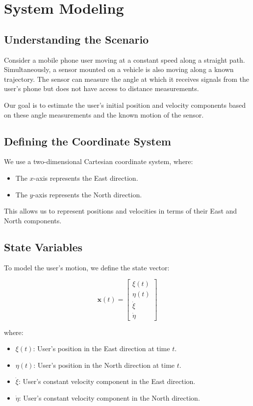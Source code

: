 \documentclass[12pt]{article}
\begin{document}
\section{System Modeling}

\subsection{Understanding the Scenario}

Consider a mobile phone user moving at a constant speed along a straight path. Simultaneously, a sensor mounted on a vehicle is also moving along a known trajectory. The sensor can measure the angle at which it receives signals from the user's phone but does not have access to distance measurements.

Our goal is to estimate the user's initial position and velocity components based on these angle measurements and the known motion of the sensor.

\subsection{Defining the Coordinate System}

We use a two-dimensional Cartesian coordinate system, where:

\begin{itemize}
    \item The \( x \)-axis represents the East direction.
    \item The \( y \)-axis represents the North direction.
\end{itemize}

This allows us to represent positions and velocities in terms of their East and North components.

\subsection{State Variables}

To model the user's motion, we define the state vector:

\[
\mathbf{x}(t) = \begin{bmatrix} \xi(t) \\ \eta(t) \\ \dot{\xi} \\ \dot{\eta} \end{bmatrix}
\]

where:

\begin{itemize}
    \item \( \xi(t) \): User's position in the East direction at time \( t \).
    \item \( \eta(t) \): User's position in the North direction at time \( t \).
    \item \( \dot{\xi} \): User's constant velocity component in the East direction.
    \item \( \dot{\eta} \): User's constant velocity component in the North direction.
\end{itemize}
\end{document}
